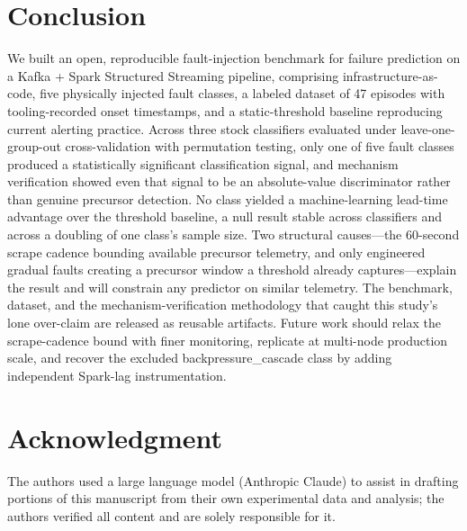 \documentclass[conference]{IEEEtran}
\newcommand{\bc}{backpressure\_cascade}
\begin{document}
\section{Conclusion}\label{sec:conclusion}
We built an open, reproducible fault-injection benchmark for failure prediction on a Kafka + Spark Structured Streaming pipeline, comprising infrastructure-as-code, five physically injected fault classes, a labeled dataset of 47 episodes with tooling-recorded onset timestamps, and a static-threshold baseline reproducing current alerting practice. Across three stock classifiers evaluated under leave-one-group-out cross-validation with permutation testing, only one of five fault classes produced a statistically significant classification signal, and mechanism verification showed even that signal to be an absolute-value discriminator rather than genuine precursor detection. No class yielded a machine-learning lead-time advantage over the threshold baseline, a null result stable across classifiers and across a doubling of one class's sample size. Two structural causes---the 60-second scrape cadence bounding available precursor telemetry, and only engineered gradual faults creating a precursor window a threshold already captures---explain the result and will constrain any predictor on similar telemetry. The benchmark, dataset, and the mechanism-verification methodology that caught this study's lone over-claim are released as reusable artifacts. Future work should relax the scrape-cadence bound with finer monitoring, replicate at multi-node production scale, and recover the excluded \bc{} class by adding independent Spark-lag instrumentation.

\section*{Acknowledgment}
The authors used a large language model (Anthropic Claude) to assist in drafting portions of this manuscript from their own experimental data and analysis; the authors verified all content and are solely responsible for it.
\end{document}
